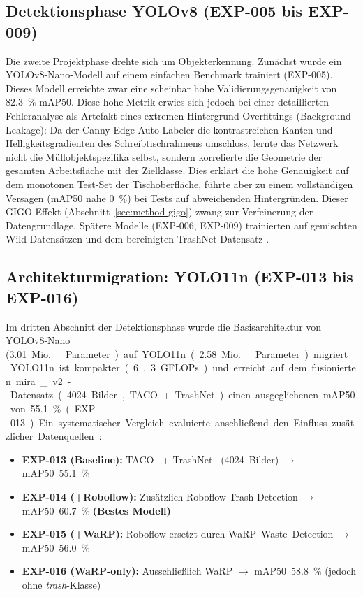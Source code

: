 \subsection{Detektionsphase YOLOv8 (EXP-005 bis EXP-009)}
Die zweite Projektphase drehte sich um Objekterkennung. Zunächst wurde ein YOLOv8-Nano-Modell auf einem einfachen Benchmark trainiert (EXP-005). Dieses Modell erreichte zwar eine scheinbar hohe Validierungsgenauigkeit von \SI{82.3}{\percent} mAP50. Diese hohe Metrik erwies sich jedoch bei einer detaillierten Fehleranalyse als Artefakt eines extremen Hintergrund-Overfittings (Background Leakage): Da der Canny-Edge-Auto-Labeler die kontrastreichen Kanten und Helligkeitsgradienten des Schreibtischrahmens umschloss, lernte das Netzwerk nicht die Müllobjektspezifika selbst, sondern korrelierte die Geometrie der gesamten Arbeitsfläche mit der Zielklasse. Dies erklärt die hohe Genauigkeit auf dem monotonen Test-Set der Tischoberfläche, führte aber zu einem vollständigen Versagen (mAP50 nahe \SI{0}{\percent}) bei Tests auf abweichenden Hintergründen. Dieser GIGO-Effekt (Abschnitt~\ref{sec:method-gigo}) zwang zur Verfeinerung der Datengrundlage. Spätere Modelle (EXP-006, EXP-009) trainierten auf gemischten Wild-Datensätzen und dem bereinigten TrashNet-Datensatz \cite{yang2016classification}.


\subsection{Architekturmigration: YOLO11n (EXP-013 bis EXP-016)}
\label{sec:exp-yolo11}
Im dritten Abschnitt der Detektionsphase wurde die Basisarchitektur von YOLOv8-Nano (\SI{3.01}{Mio.}\ Parameter) auf YOLO11n (\SI{2.58}{Mio.}\ Parameter) migriert \cite{ultralyticsyolov8}. YOLO11n ist kompakter (6,3 GFLOPs) und erreicht auf dem fusionierten mira\_v2-Datensatz (\num{4024} Bilder, TACO + TrashNet) einen ausgeglichenen mAP50 von \SI{55.1}{\percent} (EXP-013). Ein systematischer Vergleich evaluierte anschließend den Einfluss zusätzlicher Datenquellen:

\begin{itemize}
    \item \textbf{EXP-013 (Baseline):} TACO~\cite{proenca2020taco} + TrashNet~\cite{yang2016classification} (\num{4024}~Bilder) $\rightarrow$ mAP50~\SI{55.1}{\percent}
    \item \textbf{EXP-014 (+Roboflow):} Zusätzlich Roboflow Trash Detection \cite{roboflow2023trash} $\rightarrow$ mAP50~\SI{60.7}{\percent} \textbf{(Bestes Modell)}
    \item \textbf{EXP-015 (+WaRP):} Roboflow ersetzt durch WaRP~Waste~Detection \cite{warp2024dataset} $\rightarrow$ mAP50~\SI{56.0}{\percent}
    \item \textbf{EXP-016 (WaRP-only):} Ausschließlich WaRP $\rightarrow$ mAP50~\SI{58.8}{\percent} (jedoch ohne \textit{trash}-Klasse)
\end{itemize}

